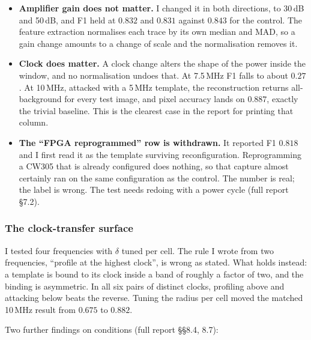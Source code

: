 \documentclass[11pt,a4paper]{article}
\begin{document}
\begin{itemize}
\item \textbf{Amplifier gain does not matter.} I changed it in both directions, to
      30\,dB and 50\,dB, and F1 held at $0.832$ and $0.831$ against $0.843$ for the
      control. The feature extraction normalises each trace by its own median and MAD, so
      a gain change amounts to a change of scale and the normalisation removes it.
\item \textbf{Clock does matter.} A clock change alters the shape of the power inside the
      window, and no normalisation undoes that. At 7.5\,MHz F1 falls to about $0.27$. At
      10\,MHz, attacked with a 5\,MHz template, the reconstruction returns all-background
      for every test image, and pixel accuracy lands on $0.887$, exactly the trivial
      baseline. This is the clearest case in the report for printing that column.
\item \textbf{The ``FPGA reprogrammed'' row is withdrawn.} It reported F1 $0.818$ and I
      first read it as the template surviving reconfiguration. Reprogramming a CW305 that
      is already configured does nothing, so that capture almost certainly ran on the same
      configuration as the control. The number is real; the label is wrong. The test needs
      redoing with a power cycle (full report \S7.2).
\end{itemize}

\subsubsection*{The clock-transfer surface}

I tested four frequencies with $\delta$ tuned per cell. The rule I wrote from two
frequencies, ``profile at the highest clock'', is wrong as stated. What holds instead: a
template is bound to its clock inside a band of roughly a factor of two, and the binding
is asymmetric. In all six pairs of distinct clocks, profiling above and attacking below
beats the reverse. Tuning the radius per cell moved the matched 10\,MHz result from
$0.675$ to $0.882$.

\begin{table}[H]
  \centering
  \small
  
  \caption{Foreground F1 for every combination of profiling and attack clock, with
  $\delta$ tuned for each cell and the chosen value shown.}
  \label{tab:gridbest}
\end{table}

Two further findings on conditions (full report \S\S8.4, 8.7):
\end{document}
